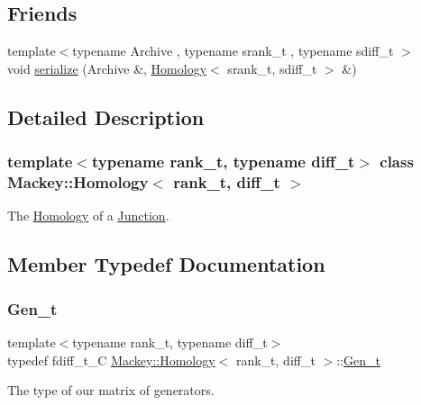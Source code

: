 \subsection*{Friends}
\begin{DoxyCompactItemize}
\item 
{\footnotesize template$<$typename Archive , typename srank\+\_\+t , typename sdiff\+\_\+t $>$ }\\void \hyperlink{classMackey_1_1Homology_afe2aae7d5b96af426bfe7a7898459cb6}{serialize} (Archive \&, \hyperlink{classMackey_1_1Homology}{Homology}$<$ srank\+\_\+t, sdiff\+\_\+t $>$ \&)
\end{DoxyCompactItemize}


\subsection{Detailed Description}
\subsubsection*{template$<$typename rank\+\_\+t, typename diff\+\_\+t$>$\newline
class Mackey\+::\+Homology$<$ rank\+\_\+t, diff\+\_\+t $>$}

The \hyperlink{classMackey_1_1Homology}{Homology} of a \hyperlink{classMackey_1_1Junction}{Junction}. 

\subsection{Member Typedef Documentation}
\mbox{\label{classMackey_1_1Homology_a9a8e354083ac094720820a5ff6bcff03}} 
\subsubsection{\texorpdfstring{Gen\+\_\+t}{Gen\_t}}
{\footnotesize\ttfamily template$<$typename rank\+\_\+t, typename diff\+\_\+t$>$ \\
typedef fdiff\+\_\+t\+\_\+C \hyperlink{classMackey_1_1Homology}{Mackey\+::\+Homology}$<$ rank\+\_\+t, diff\+\_\+t $>$\+::\hyperlink{classMackey_1_1Homology_a9a8e354083ac094720820a5ff6bcff03}{Gen\+\_\+t}}



The type of our matrix of generators. 

